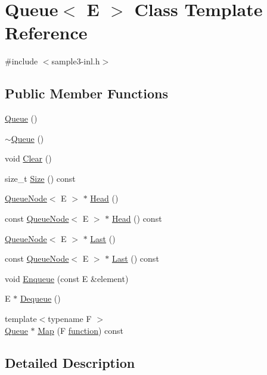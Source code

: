 \hypertarget{class_queue}{}\section{Queue$<$ E $>$ Class Template Reference}
\label{class_queue}


{\ttfamily \#include $<$sample3-\/inl.\+h$>$}

\subsection*{Public Member Functions}
\begin{DoxyCompactItemize}
\item 
\hyperlink{class_queue_ab09891e54b51dc677ee6efb350687ae4}{Queue} ()
\item 
\hyperlink{class_queue_a49fe82adb8dc2fb62ab53876a6933d0f}{$\sim$\+Queue} ()
\item 
void \hyperlink{class_queue_acfdd5f9f7e936ca30dcf877370ef9510}{Clear} ()
\item 
size\+\_\+t \hyperlink{class_queue_a8d69a34b2dfccbf1343b7fc4ba35da90}{Size} () const 
\item 
\hyperlink{class_queue_node}{Queue\+Node}$<$ E $>$ $\ast$ \hyperlink{class_queue_a71aa0154ef75bb87a53b6af1829fcd5e}{Head} ()
\item 
const \hyperlink{class_queue_node}{Queue\+Node}$<$ E $>$ $\ast$ \hyperlink{class_queue_a877051b27c1c844ab5d5455116a54e57}{Head} () const 
\item 
\hyperlink{class_queue_node}{Queue\+Node}$<$ E $>$ $\ast$ \hyperlink{class_queue_a430aca3d3b9f5fd588b215028d134b74}{Last} ()
\item 
const \hyperlink{class_queue_node}{Queue\+Node}$<$ E $>$ $\ast$ \hyperlink{class_queue_a9b162059e84011b0088b22fc6dc8d188}{Last} () const 
\item 
void \hyperlink{class_queue_abaa2e7175457307bca74f5562cbdaaa9}{Enqueue} (const E \&element)
\item 
E $\ast$ \hyperlink{class_queue_a434d465001c3078e999f7a89a8af84c0}{Dequeue} ()
\item 
{\footnotesize template$<$typename F $>$ }\\\hyperlink{class_queue}{Queue} $\ast$ \hyperlink{class_queue_a7cb2f6585319ba1fd19d2347d95e71c1}{Map} (F \hyperlink{_07copy_08_2_undistort_image_8m_aa0b19300b507d475ab9f1525750bc11f}{function}) const 
\end{DoxyCompactItemize}


\subsection{Detailed Description}
